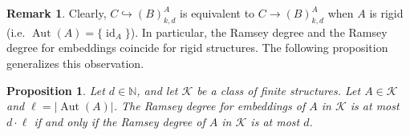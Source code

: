 \documentclass[12pt]{amsart}
\theoremstyle{plain}
\newtheorem{proposition}[theorem]{Proposition}
\theoremstyle{definition}
\newtheorem{remark}[theorem]{Remark}
\begin{document}
\begin{remark}\label{rem:rigiddegrees} Clearly, $C\hookrightarrow (B)^A_{k,d}$ is equivalent to $C\rightarrow (B)^A_{k,d}$ when $A$ is rigid (i.e. $\operatorname{Aut}(A)=\{\operatorname{id}_A\}$). In particular, the Ramsey degree and the Ramsey degree for embeddings coincide for rigid structures. The following proposition generalizes this observation.
\end{remark}

\begin{proposition}\label{prop:emb} Let $d\in{\mathbb N}$, and let ${\mathcal K}$ be a class of finite structures. Let $A\in{\mathcal K}$ and $\ell=|\operatorname{Aut}(A)|$. 
The Ramsey degree for embeddings of $A$ in ${\mathcal K}$ is at most $d\cdot\ell$ if and only if 
the Ramsey degree of $A$ in ${\mathcal K}$ is at most $d$. 
\end{proposition}
\end{document}
